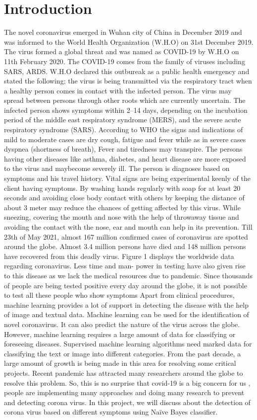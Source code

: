 \documentclass[conference]{IEEEtran}
\begin{document}
\section{Introduction}
The novel coronavirus emerged in Wuhan city of China in December 2019 and was informed to the World Health Organization (W.H.O) on 31st December 2019. The virus formed a global threat and was named as COVID-19 by W.H.O on 11th February 2020. The COVID-19 comes from the family of viruses including SARS, ARDS. W.H.O declared this outbureak as a public health emergency and stated the following; the virus is being transmitted via the respiratory tract when a healthy person comes in contact with the infected person. The virus may spread between persons through other roots which are currently uncertain. The infected person shows symptoms within 2–14 days, depending on the incubation period of the middle east respiratory syndrome (MERS), and the severe acute respiratory syndrome (SARS). According to WHO the signs and indications of mild to moderate cases are dry cough, fatigue and fever while as in severe cases dyspnea (shortness of breath), Fever and tiredness may transpire. The persons having other diseases like asthma, diabetes, and heart disease are more exposed to  the virus and maybecome severely ill. The person is diagnoses based on symptoms and his travel history. Vital signs are being experimental keenly of the client having symptoms. By washing hands regularly with soap for at least 20 seconds and avoiding close body contact with others by keeping the distance of about 3 meter may reduce the chances of getting affected by this virus. While sneezing, covering the mouth and nose with the help of throwaway tissue and avoiding the contact with the nose, ear and mouth can help in its prevention. Till 23th of May 2021, almost 167 million confirmed cases of coronavirus are spotted around the globe. Almost 3.4 million persons have died and 148 million persons have recovered from this deadly virus. Figure 1 displays the worldwide data regarding coronavirus. Less time and man- power in testing have also given rise to this disease as we lack the medical resources due to pandemic. Since thousands of people are being tested positive every day around the globe, it is not possible to test all these people who show symptoms Apart from clinical procedures, machine learning provides a lot of support in detecting the disease with the help of image and textual data. Machine learning can be used for the identification of novel coronavirus. It can also predict the nature of the virus across the globe. However, machine learning requires a large amount of data for classifying or foreseeing diseases. Supervised machine learning algorithms need marked data for classifying the text or image into different categories. From the past decade, a large amount of growth is being made in this area for resolving some critical projects. Recent pandemic has attracted many researchers around the globe to resolve this problem. So, this is no surprise that covid-19 is a big concern for us , people are implementing many approaches and doing many research to prevent and detecting corona virus. In this project, we will discuss about the detection of corona virus based on different symptoms using Naïve Bayes classifier.
\end{document}
